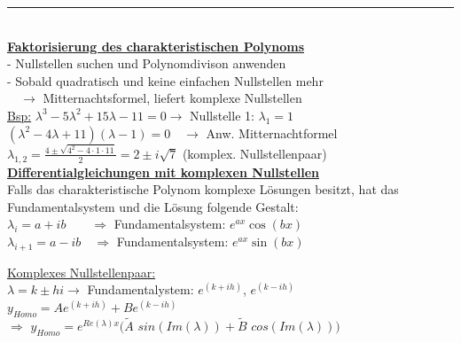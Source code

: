 \documentclass[6pt]{article}
\begin{document}
\begin{multicols*}{3}
	\vspace{-1mm}
  		\noindent\textcolor{gray}{\rule{9cm}{0.2pt}}
	\vspace{2mm}\\
	
	{\bf \underline{Faktorisierung des charakteristischen Polynoms} } 
	\vspace{3mm}\\
	- Nullstellen suchen und Polynomdivison anwenden\\
	- Sobald quadratisch und keine einfachen Nullstellen mehr \\
	 $\quad \rightarrow $ Mitternachtsformel, liefert komplexe Nullstellen \vspace{0mm}\\
	 
	 \underline{Bsp:} $\lambda^3-5\lambda^2 + 15 \lambda - 11 = 0  \rightarrow$ Nullstelle 1: $\lambda_1 = 1$ \\ $(\lambda^2 - 4\lambda + 11)(\lambda -1) = 0 \quad  \rightarrow $ Anw. Mitternachtformel \vspace{1mm}\\
	 		$\lambda_{1,2} = \frac{4 \pm \sqrt{4^2 - 4\cdot 1\cdot 11}}{2} = 2 \pm i\sqrt{7}$ (komplex. Nullstellenpaar)\vspace{2mm}\\
	 
	
	
	{\bf \underline{Differentialgleichungen mit komplexen Nullstellen} } \vspace{3mm}\\
	Falls das charakteristische Polynom komplexe L{\"o}sungen besitzt, hat das Fundamentalsystem und die L{\"o}sung folgende Gestalt: \vspace{0mm} \\
	
	$\lambda_i = a+ib \quad \quad \Rightarrow$ Fundamentalsystem: $e^{ax} \cos (bx)$  \\  
	$\lambda_{i+1} = a-ib \quad \Rightarrow$ Fundamentalsystem: $e^{ax} \sin (bx)$
				
	\vspace{3mm} 
	
	\underline {Komplexes Nullstellenpaar:} \vspace{1mm} \\
		$\lambda = k \pm hi \rightarrow $ Fundamentalystem: $e^{(k+ih)}$, $e^{(k-ih)}$ \vspace{1mm} \\
	$y_{Homo} = Ae^{(k+ih)} + Be^{(k-ih)}$ \vspace{1mm} \\
	$\Rightarrow$  $y_{Homo} = e^{Re(\lambda)x}(\tilde{A}$ $sin(Im(\lambda)) + \tilde{B}$ $cos(Im(\lambda)) )$ \vspace{2mm} \\
	

\end{multicols*}
\end{document}
